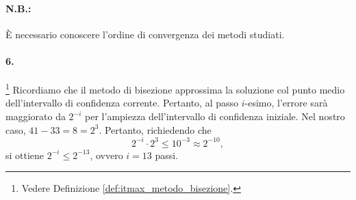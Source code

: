 \paragraph{N.B.:} È necessario conoscere l'ordine di convergenza dei metodi studiati.

\paragraph{6. }\footnote{Vedere Definizione \ref{def:itmax_metodo_bisezione}.} Ricordiamo che il metodo di bisezione approssima la soluzione col punto medio dell'intervallo di confidenza corrente. Pertanto, al passo $i$-esimo, l'errore sarà maggiorato da $2^{-i}$ per l'ampiezza dell'intervallo di confidenza iniziale. Nel nostro caso, $41-33=8=2^3$. Pertanto, richiedendo che
\begin{equation*}
	2^{-i}\cdot 2^3\leq 10^{-3}\approx 2^{-10},
\end{equation*}
si ottiene $2^{-i}\leq 2^{-13}$, ovvero $i=13$ passi.

